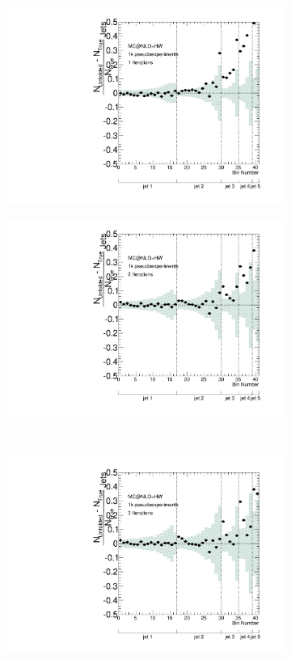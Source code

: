 \clearpage
\begin{figure}
\begin{subfigure}[]{0.5\textwidth}
\includegraphics[width=\textwidth]{fig/Stress/105200atlfast/FracBias1Iterations.pdf}
\end{subfigure}
\begin{subfigure}[]{0.5\textwidth}
\includegraphics[width=\textwidth]{fig/Stress/105200atlfast/FracBias2Iterations.pdf}
\end{subfigure}
\\
\begin{subfigure}[]{0.5\textwidth}
\includegraphics[width=\textwidth]{fig/Stress/105200atlfast/FracBias3Iterations.pdf}

\end{subfigure}
\end{figure}
